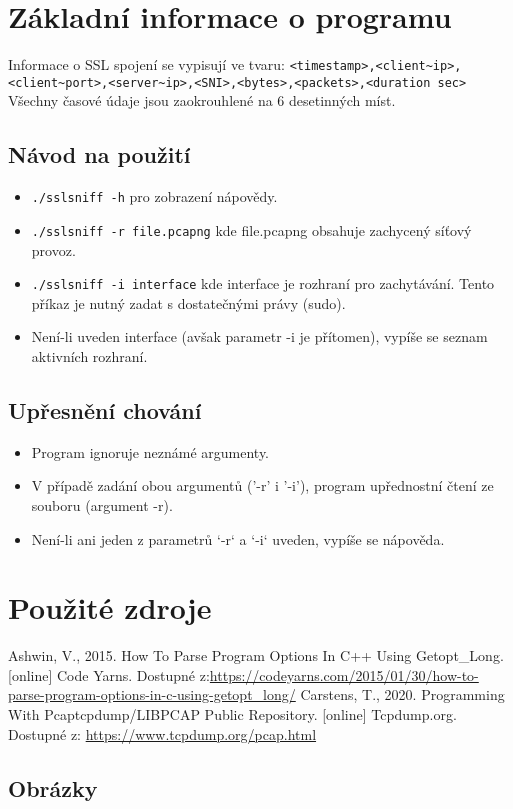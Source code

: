 \documentclass[a4paper, 12pt, titlepage]{article}
\begin{document}
\section{Základní informace o programu}
Informace o SSL spojení se vypisují ve tvaru: \verb|<timestamp>,<client~ip>,<client~port>,<server~ip>,<SNI>,<bytes>,<packets>,<duration sec>|\newline
Všechny časové údaje jsou zaokrouhlené na 6 desetinných míst.

\subsection{Návod na použití}
\begin{itemize}
  \item \verb|./sslsniff -h| pro zobrazení nápovědy.
  \item \verb|./sslsniff -r file.pcapng| kde file.pcapng obsahuje zachycený síťový provoz.
  \item \verb|./sslsniff -i interface| kde interface je rozhraní pro zachytávání. Tento příkaz je nutný zadat s dostatečnými právy (sudo).
  \item Není-li uveden interface (avšak parametr -i je přítomen), vypíše se seznam aktivních rozhraní.
\end{itemize}

\subsection{Upřesnění chování}
\begin{itemize}
    \item Program ignoruje neznámé argumenty.
    \item V případě zadání obou argumentů ('-r' i '-i'), program upřednostní čtení ze souboru (argument -r).
    \item Není-li ani jeden z parametrů `-r` a `-i` uveden, vypíše se nápověda. 
\end{itemize}

\newpage
\section{Použité zdroje}
\begin{thebibliography}{99}
 Ashwin, V., 2015. How To Parse Program Options In C++ Using Getopt\_Long. [online] Code Yarns. Dostupné z:\url{https://codeyarns.com/2015/01/30/how-to-parse-program-options-in-c-using-getopt\_long/}
 Carstens, T., 2020. Programming With Pcaptcpdump/LIBPCAP Public Repository. [online] Tcpdump.org. Dostupné z: \url{https://www.tcpdump.org/pcap.html}

\end{thebibliography}

\subsection{Obrázky}
\begin{thebibliography}{99}
\end{thebibliography}
\end{document}
